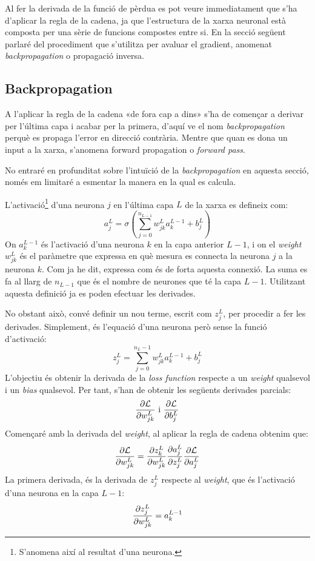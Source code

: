 Al fer la derivada de la funció de pèrdua es pot veure immediatament que s'ha d'aplicar la regla de la cadena, ja que l'estructura de la xarxa neuronal està composta per una sèrie de funcions compostes entre si. En la secció següent parlaré del procediment que s'utilitza per avaluar el gradient, anomenat \textit{backpropagation} o propagació inversa.

\subsection{Backpropagation}
A l'aplicar la regla de la cadena «de fora cap a dins» s'ha de començar a derivar per l'última capa i acabar per la primera, d'aquí ve el nom \textit{backpropagation} perquè es propaga l'error en direcció contrària. Mentre que quan es dona un input a la xarxa, s'anomena {forward propagation} o \textit{forward pass}.

No entraré en profunditat sobre l'intuïció de la \textit{backpropagation} en aquesta secció, només em limitaré a esmentar la manera en la qual es calcula.

L'activació\footnote{S'anomena així al resultat d'una neurona.} d'una neurona $j$ en l'última capa $L$ de la xarxa es defineix com: 
$$
a^{L}_j = \sigma\left(\sum_{j=0}^{n_{L- 1}}w^L_{jk} a^{L-1}_k+ b_j^L\right)
$$
On $a^{L-1}_k$ és l'activació d'una neurona $k$ en la capa anterior $L-1$, i on el \textit{weight} $w^L_{jk}$ és el paràmetre que expressa en què mesura es connecta la neurona $j$ a la neurona $k$. Com ja he dit, expressa com és de forta aquesta connexió. La suma es fa al llarg de $n_{L-1}$ que és el nombre de neurones que té la capa $L-1$. Utilitzant aquesta definició ja es poden efectuar les derivades.

No obstant això, convé definir un nou terme, escrit com $z_j^L$, per procedir a fer les derivades. Simplement, és l'equació d'una neurona però sense la funció d'activació:
\begin{equation}
\label{eq:neuron_definition}
	z_j^L = \sum_{j=0}^{n_L - 1}w^L_{jk} a^{L-1}_k+ b_j^L
\end{equation}
L'objectiu és obtenir la derivada de la \textit{loss function} respecte a un \textit{weight} qualsevol i un \textit{bias} qualsevol. Per tant, s'han de obtenir les següents derivades parcials:
$$
\pdv{\mathcal{L}}{w_{jk}^L} \text{ i } \pdv{\mathcal{L}}{b_j^L}
$$
Començaré amb la derivada del \textit{weight}, al aplicar la regla de cadena obtenim que:
\begin{equation}
	\pdv{\mathcal{L}}{w_{jk}^L} = \pdv{z_k^L}{w_{jk}^L}\pdv{a_j^L}{z_j^L}\pdv{\mathcal{L}}{a_j^L}
	\label{eq:chain_neuron}
\end{equation}
La primera derivada, és la derivada de $z_j^L$ respecte al \textit{weight}, que és l'activació d'una neurona en la capa $L-1$:
\begin{equation*}
	\pdv{z_j^L}{w_{jk}^L} = a^{L-1}_k
\end{equation*}

